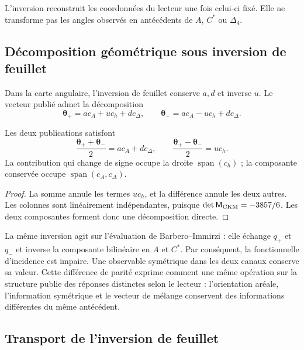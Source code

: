 L'inversion reconstruit les coordonnées du lecteur une fois celui-ci fixé. Elle ne
transforme pas les angles observés en antécédents de \(A\), \(C^*\) ou
\(\Delta_4\).


\subsection{Décomposition géométrique sous inversion de feuillet}
\label{ii:sec:ii09-descomposicion-paridad}

Dans la carte angulaire, l'inversion de feuillet conserve \(a,d\) et
inverse \(u\). Le vecteur publié admet la décomposition
\[
 \boldsymbol\theta_+=a c_A+u c_h+d c_\Delta,
 \qquad
 \boldsymbol\theta_-=a c_A-u c_h+d c_\Delta.
\]
\begin{proposition}
\label{ii:prop:ii09-paridad-angular}
Les deux publications satisfont
\[
 \frac{\boldsymbol\theta_++\boldsymbol\theta_-}{2}
       =a c_A+d c_\Delta,\qquad
 \frac{\boldsymbol\theta_+-\boldsymbol\theta_-}{2}=u c_h.
\]
La contribution qui change de signe occupe la droite
\(\operatorname{span}(c_h)\) ; la composante conservée occupe
\(\operatorname{span}(c_A,c_\Delta)\).
\end{proposition}
\begin{proof}
La somme annule les termes \(u c_h\), et la différence annule
les deux autres. Les colonnes sont linéairement indépendantes, puisque
\(\det\mathsf M_{\rm CKM}=-3857/6\). Les deux
composantes forment donc une décomposition directe.
\end{proof}

La même inversion agit sur l'évaluation de Barbero--Immirzi :
elle échange \(q_+\) et \(q_-\) et inverse la composante bilinéaire
en \(A\) et \(C^*\). Par conséquent, la fonctionnelle d'incidence
est impaire. Une observable symétrique dans les deux canaux conserve sa
valeur. Cette différence de parité exprime comment une même
opération sur la structure publie des réponses distinctes selon
le lecteur : l'orientation aréale, l'information symétrique et le vecteur de
mélange conservent des informations différentes du même antécédent.



\subsection{Transport de l'inversion de feuillet}

